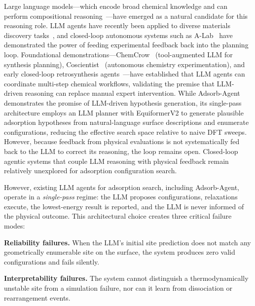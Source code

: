 Large language models---which encode broad chemical knowledge and can perform compositional reasoning~\cite{mirza2024chembench,bran2024chemcrow}---have emerged as a natural candidate for this reasoning role.
LLM agents have recently been applied to diverse materials discovery tasks~\cite{zimmermann2025llm,yang2026quasar,stewart2026graphagents,chandrasekhar2026catalyst,weietal2025agentic}, and closed-loop autonomous systems such as A-Lab~\cite{szymanski2023alab} have demonstrated the power of feeding experimental feedback back into the planning loop.
Foundational demonstrations---ChemCrow~\cite{bran2024chemcrow} (tool-augmented LLM for synthesis planning), Coscientist~\cite{boiko2023autonomous} (autonomous chemistry experimentation), and early closed-loop retrosynthesis agents~\cite{schwaller2020predicting}---have established that LLM agents can coordinate multi-step chemical workflows, validating the premise that LLM-driven reasoning can replace manual expert intervention.
While Adsorb-Agent~\cite{ock2026adsorbagent} demonstrates the promise of LLM-driven hypothesis generation, its single-pass architecture employs an LLM planner with EquiformerV2 to generate plausible adsorption hypotheses from natural-language surface descriptions and enumerate configurations, reducing the effective search space relative to naive DFT sweeps.
However, because feedback from physical evaluations is not systematically fed back to the LLM to correct its reasoning, the loop remains open.
Closed-loop agentic systems that couple LLM reasoning with physical feedback remain relatively unexplored for adsorption configuration search.

However, existing LLM agents for adsorption search, including Adsorb-Agent, operate in a \textit{single-pass} regime: the LLM proposes configurations, relaxations execute, the lowest-energy result is reported, and the LLM is never informed of the physical outcome.
This architectural choice creates three critical failure modes:

\textbf{Reliability failures.}
When the LLM's initial site prediction does not match any geometrically enumerable site on the surface, the system produces zero valid configurations and fails silently.

\textbf{Interpretability failures.}
The system cannot distinguish a thermodynamically unstable site from a simulation failure, nor can it learn from dissociation or rearrangement events.

